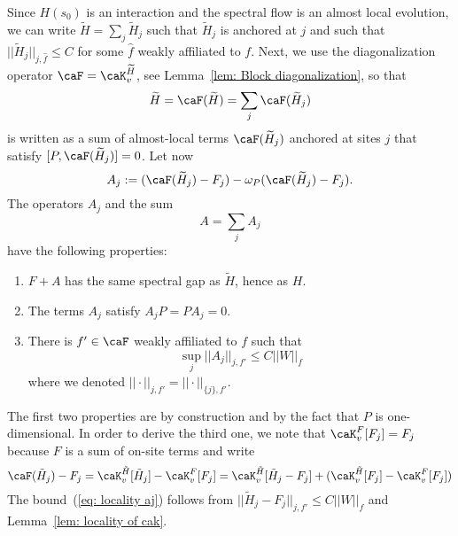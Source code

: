 Since $H(s_0)$ is an interaction and the spectral flow is an almost local evolution, we can write $\widetilde H=\sum_j \widetilde H_j$ such that $\widetilde H_j$ is anchored at $j$ and such that $|| \widetilde H_j||_{j,\hat{f}} \leq C$ for some $\hat{f}$ weakly affiliated to $f$. Next, we use the diagonalization operator $\caF=\caK_v^{\widetilde H}$, see Lemma~\ref{lem: Block diagonalization}, so that 
$$
\widetilde H= \caF(\widetilde H) = \sum_j  \caF(\widetilde H_j) 
$$
is written as a sum of almost-local terms $\caF(\widetilde H_j)$ anchored at sites $j$ that satisfy $[P,\caF(\widetilde H_j)]=0$. 
Let now
%
\begin{equation}\label{Aj}
	A_j:= (\caF(\widetilde H_j) -F_j) - \omega_P(\caF(\widetilde H_j)-F_j) .
\end{equation}
%
The operators $A_j$ and the sum 
%
\begin{equation}\label{A}
	A=\sum_j A_j
\end{equation}
%
have the following properties:
\begin{enumerate}
	\item $F+A$ has the same spectral gap as $\widetilde H$, hence as $H$.
	\item The terms $A_j$ satisfy $A_j P=PA_j = 0$. 
	\item There is $f'\in\caF$ weakly affiliated to $f$ such that 
	\begin{equation} \label{eq: locality aj}
		\sup_j || A_j ||_{j,f'} \leq C || W||_f
	\end{equation}
	where we denoted $||\cdot||_{j,f'}=||\cdot||_{\{j\},f'}$.
\end{enumerate}
The first two properties are by construction and by the fact that $P$ is one-dimensional. In order to derive the third one, we note that $\caK_v^{F}[F_j] = F_j$ because $F$ is a sum of on-site terms and write
%
\begin{equation*}
	\caF(\tilde H_j) - F_j = \caK_v^{\tilde H}[\tilde H_j] - \caK_v^{F}[F_j]
	= \caK_v^{\tilde H}[\tilde H_j - F_j] + (\caK_v^{\tilde H}[F_j] - \caK_v^{F}[F_j])
\end{equation*}
%
The bound~(\ref{eq: locality aj}) follows from $||\tilde H_j - F_j||_{j,f'}\leq C||W||_f$ and Lemma~\ref{lem: locality of cak}.

